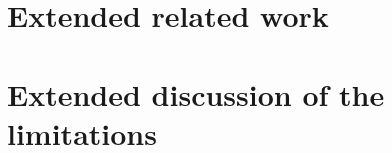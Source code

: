 

\section{Extended related work}
\label{app:related}



\section{Extended discussion of the limitations}
\label{app:limits}


